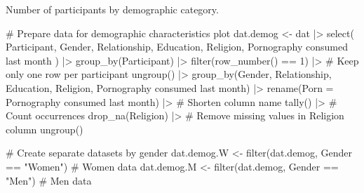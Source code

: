 \documentclass[
  bookmarksnumbered]{article}
\newenvironment{Shaded}{\begin{snugshade}}{\end{snugshade}}
\newcommand{\AttributeTok}[1]{\textcolor[rgb]{0.80,0.80,0.80}{#1}}
\newcommand{\CommentTok}[1]{\textcolor[rgb]{0.50,0.62,0.50}{#1}}
\newcommand{\DecValTok}[1]{\textcolor[rgb]{0.86,0.86,0.80}{#1}}
\newcommand{\FunctionTok}[1]{\textcolor[rgb]{0.94,0.94,0.56}{#1}}
\newcommand{\NormalTok}[1]{\textcolor[rgb]{0.80,0.80,0.80}{#1}}
\newcommand{\OtherTok}[1]{\textcolor[rgb]{0.94,0.94,0.56}{#1}}
\newcommand{\SpecialCharTok}[1]{\textcolor[rgb]{0.86,0.64,0.64}{#1}}
\newcommand{\StringTok}[1]{\textcolor[rgb]{0.80,0.58,0.58}{#1}}
\begin{document}
Number of participants by demographic category.

\begin{Shaded}
\begin{Highlighting}[]
\CommentTok{\# Prepare data for demographic characteristics plot}
\NormalTok{dat.demog }\OtherTok{\textless{}{-}}\NormalTok{ dat }\SpecialCharTok{|\textgreater{}}
  \FunctionTok{select}\NormalTok{(}
\NormalTok{    Participant, Gender, Relationship, Education, Religion, }\StringTok{\textasciigrave{}}\AttributeTok{Pornography consumed last month}\StringTok{\textasciigrave{}}
\NormalTok{  ) }\SpecialCharTok{|\textgreater{}}
  \FunctionTok{group\_by}\NormalTok{(Participant) }\SpecialCharTok{|\textgreater{}}
  \FunctionTok{filter}\NormalTok{(}\FunctionTok{row\_number}\NormalTok{() }\SpecialCharTok{==} \DecValTok{1}\NormalTok{) }\SpecialCharTok{|\textgreater{}} \CommentTok{\# Keep only one row per participant}
  \FunctionTok{ungroup}\NormalTok{() }\SpecialCharTok{|\textgreater{}}
  \FunctionTok{group\_by}\NormalTok{(Gender, Relationship, Education, Religion, }\StringTok{\textasciigrave{}}\AttributeTok{Pornography consumed last month}\StringTok{\textasciigrave{}}\NormalTok{) }\SpecialCharTok{|\textgreater{}}
  \FunctionTok{rename}\NormalTok{(}\AttributeTok{Porn =} \StringTok{\textasciigrave{}}\AttributeTok{Pornography consumed last month}\StringTok{\textasciigrave{}}\NormalTok{) }\SpecialCharTok{|\textgreater{}} \CommentTok{\# Shorten column name}
  \FunctionTok{tally}\NormalTok{() }\SpecialCharTok{|\textgreater{}} \CommentTok{\# Count occurrences}
  \FunctionTok{drop\_na}\NormalTok{(Religion) }\SpecialCharTok{|\textgreater{}} \CommentTok{\# Remove missing values in Religion column}
  \FunctionTok{ungroup}\NormalTok{()}

\CommentTok{\# Create separate datasets by gender}
\NormalTok{dat.demog.W }\OtherTok{\textless{}{-}} \FunctionTok{filter}\NormalTok{(dat.demog, Gender }\SpecialCharTok{==} \StringTok{"Women"}\NormalTok{) }\CommentTok{\# Women data}
\NormalTok{dat.demog.M }\OtherTok{\textless{}{-}} \FunctionTok{filter}\NormalTok{(dat.demog, Gender }\SpecialCharTok{==} \StringTok{"Men"}\NormalTok{) }\CommentTok{\# Men data}


\end{Highlighting}
\end{Shaded}
\end{document}
